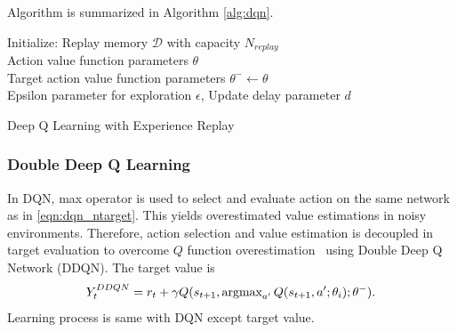 Algorithm is summarized in Algorithm \ref{alg:dqn}. 
\begin{algorithm}
	\SetAlgoLined
	\DontPrintSemicolon %
	Initialize: Replay memory $\mathcal{D}$ with capacity $N_{replay}$ \\
	Action value function parameters $\theta$ \\
	Target action value function parameters $\theta^- \leftarrow \theta$ \\
	Epsilon parameter for exploration $\epsilon$, Update delay parameter $d$ \\
	\caption{Deep Q Learning with Experience Replay}
	\label{alg:dqn}
\end{algorithm}

\subsubsection{Double Deep Q Learning}
In DQN, max operator is used to select and evaluate action on the same network as in \eqref{eqn:dqn_ntarget}. 
This yields overestimated value estimations in noisy environments. 
Therefore, action selection and value estimation is decoupled in target evaluation 
to overcome $Q$ function overestimation~\cite{van_hasselt_deep_2015} using Double Deep Q Network (DDQN). The target value is
\begin{equation}
\label{eqn:ddqn_ntarget}
Y_t^{DDQN} = r_t + \gamma Q(s_{t+1}, \operatorname{\textup{argmax}}_{a'} Q(s_{t+1}, a'; \theta_i );\theta^-).
\end{equation}
Learning process is same with DQN except target value. 

